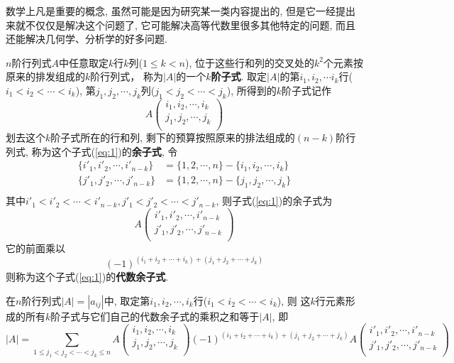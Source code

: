 \begin{Note}
数学上凡是重要的概念, 虽然可能是因为研究某一类内容提出的, 但是它一经提出来就不仅仅是解决这个问题了, 它可能解决高等代数里很多其他特定的问题, 而且还能解决几何学、分析学的好多问题.
\end{Note}

\begin{Definition}
$n$阶行列式$A$中任意取定$k$行$k$列($1 \le k < n$), 位于这些行和列的交叉处的$k^2$个元素按原来的排发组成的$k$阶行列式，
称为$|A|$的一个\textbf{$k$阶子式}. 取定$|A|$的第$i_1, i_2, \cdots i_k$行($i_1 < i_2 < \cdots < i_k$), 第$j_1, j_2, \cdots, j_k$列($j_1 < j_2 < \cdots < j_k$), 所得到的$k$阶子式记作
\begin{equation} \label{eq:1}
A \begin{pmatrix}
i_1, i_2, \cdots, i_k \\
j_1, j_2, \cdots, j_k \\
\end{pmatrix}
\end{equation}
划去这个$k$阶子式所在的行和列, 剩下的预算按照原来的排法组成的$(n-k)$阶行列式, 称为这个子式(\ref{eq:1})的\textbf{余子式},
令
$$
\begin{aligned}
\{ i'_1, i'_2, \cdots, i'_{n-k} \} &= \{ 1, 2, \cdots, n \} - \{ i_1, i_2, \cdots, i_k \} \\
\{ j'_1, j'_2, \cdots, j'_{n-k} \} &= \{ 1, 2, \cdots, n \} - \{ j_1, j_2, \cdots, j_k \} \\
\end{aligned}
$$
其中$i'_1 < i'_2 < \cdots < i'_{n-k}, j'_1 < j'_2 < \cdots < j'_{n-k}$, 则子式(\ref{eq:1})的余子式为
$$
A \begin{pmatrix}
i'_1, i'_2, \cdots, i'_{n-k} \\
j'_1, j'_2, \cdots, j'_{n-k} \\
\end{pmatrix}
$$
它的前面乘以 
$${(-1)}^{(i_1 + i_2 + \cdots + i_k ) + (j_1 +j_2 + \cdots + j_k)}$$
则称为这个子式(\ref{eq:1})的\textbf{代数余子式}.
\end{Definition}

\begin{Theorem}[Laplace定理]
在$n$阶行列式$|A| = |a_{ij}|$中, 取定第$i_1, i_2, \cdots, i_k$行($i_1 < i_2 < \cdots < i_k$), 则
这$k$行元素形成的所有$k$阶子式与它们自己的代数余子式的乘积之和等于$|A|$, 即
$$
|A| = \sum_{1 \le j_1 < j_2 < \cdots < j_k \le n} A\begin{pmatrix}
i_1, i_2, \cdots, i_k \\
j_1, j_2, \cdots, j_k \\
\end{pmatrix} (-1)^{(i_1 + i_2 + \cdots + i_k) + (j_1 + j_2 + \cdots + j_k)} A \begin{pmatrix}
i'_1, i'_2, \cdots, i'_{n-k} \\
j'_1, j'_2, \cdots, j'_{n-k} \\
\end{pmatrix}
$$
\end{Theorem}

